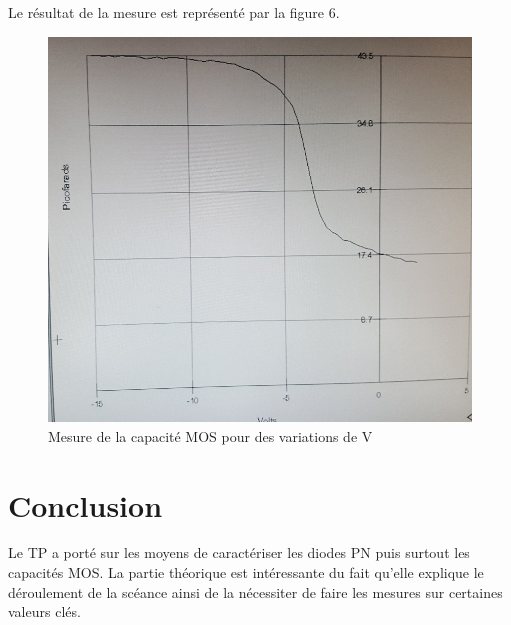 \documentclass[11pt]{article}
\begin{document}
\clearpage

Le r\'esultat de la mesure est repr\'esent\'e par la figure 6.

\begin{figure}[!htb]
\centering
\includegraphics[scale=0.35]{allure_reelle_.jpg}
\caption{Mesure de la capacit\'e MOS pour des variations de V}
\end{figure}

\section{Conclusion}

Le TP a port\'e sur les moyens de caract\'eriser les diodes PN puis surtout les capacit\'es MOS. La partie th\'eorique est int\'eressante du fait qu'elle explique le d\'eroulement de la sc\'eance ainsi de la n\'ecessiter de faire les mesures sur certaines valeurs cl\'es. 
\end{document}
